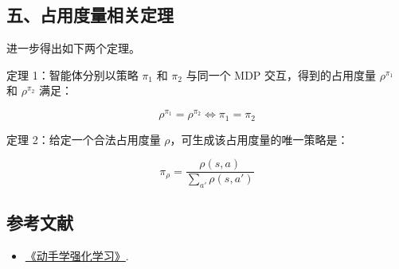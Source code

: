 \hypertarget{ux4e94ux5360ux7528ux5ea6ux91cfux76f8ux5173ux5b9aux7406}{%
\subsection{五、占用度量相关定理}\label{ux4e94ux5360ux7528ux5ea6ux91cfux76f8ux5173ux5b9aux7406}}

进一步得出如下两个定理。

定理 1：智能体分别以策略 \(\pi_1\) 和 \(\pi_2\) 与同一个 MDP 交互，得到的占用度量 \(\rho^{\pi_1}\) 和 \(\rho^{\pi_2}\) 满足：

\[
\rho^{\pi_1} = \rho^{\pi_2} \Longleftrightarrow \pi_1 = \pi_2
\]

定理 2：给定一个合法占用度量 \(\rho\)，可生成该占用度量的唯一策略是：

\[
\pi_\rho = \frac{\rho(s,a)}{\sum_{a'}\rho(s,a')}
\]

\FloatBarrier
{}
\hypertarget{ux53c2ux8003ux6587ux732e-44}{%
\subsection{参考文献}\label{ux53c2ux8003ux6587ux732e-44}}

\vspace{0.25em}
\begin{itemize}
\tightlist
\item
  \href{https://hrl.boyuai.com/}{《动手学强化学习》}.
\end{itemize}

\clearpage

